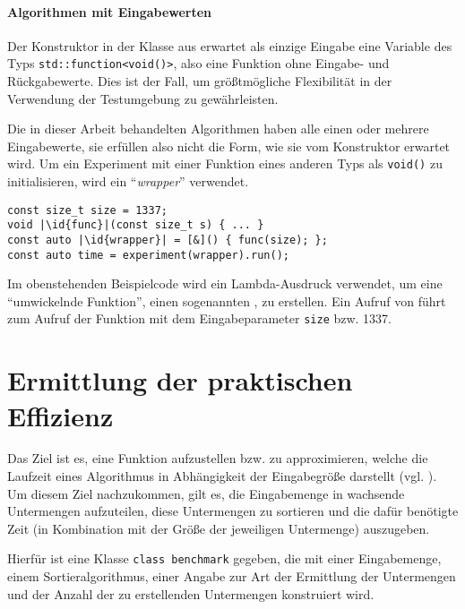 \paragraph{Algorithmen mit Eingabewerten} Der Konstruktor in der Klasse aus  erwartet als einzige Eingabe eine Variable des Typs \lstinline{std::function<void()>}, also eine Funktion ohne Eingabe- und Rückgabewerte. Dies ist der Fall, um größtmögliche Flexibilität in der Verwendung der Testumgebung zu gewährleisten.

Die in dieser Arbeit behandelten Algorithmen haben alle einen oder mehrere Eingabewerte, sie erfüllen also nicht die Form, wie sie vom Konstruktor erwartet wird. Um ein Experiment mit einer Funktion eines anderen Typs als \lstinline{void()} zu initialisieren, wird ein \enquote{\emph{wrapper}} verwendet.

\begin{minipage}{\linewidth}
\begin{lstlisting}[style=inline]
const size_t size = 1337;
void |\id{func}|(const size_t s) { ... }
const auto |\id{wrapper}| = [&]() { func(size); };
const auto time = experiment(wrapper).run();
\end{lstlisting}
\end{minipage}

Im obenstehenden Beispielcode wird ein Lambda-Ausdruck verwendet, um eine \enquote{umwickelnde Funktion}, einen sogenannten , zu erstellen. Ein Aufruf von  führt zum Aufruf der Funktion  mit dem Eingabeparameter \lstinline{size} bzw. 1337.

\section{Ermittlung der praktischen Effizienz}
\label{sec:funkterm}

Das Ziel ist es, eine Funktion aufzustellen bzw. zu approximieren, welche die Laufzeit eines Algorithmus in Abhängigkeit der Eingabegröße darstellt (vgl. \cite[37]{mcg2012}). Um diesem Ziel nachzukommen, gilt es, die Eingabemenge in wachsende Untermengen aufzuteilen, diese Untermengen zu sortieren und die dafür benötigte Zeit (in Kombination mit der Größe der jeweiligen Untermenge) auszugeben.

Hierfür ist eine Klasse \lstinline{class benchmark} gegeben, die mit einer Eingabemenge, einem Sortieralgorithmus, einer Angabe zur Art der Ermittlung der Untermengen und der Anzahl der zu erstellenden Untermengen konstruiert wird.

